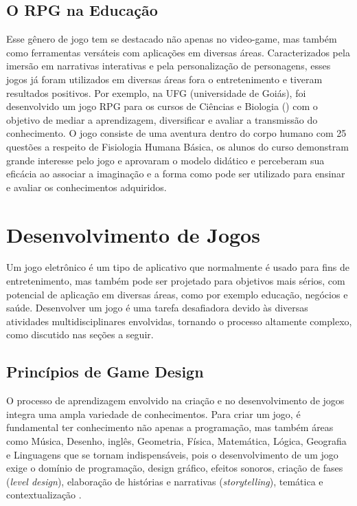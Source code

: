 \subsection{O RPG na Educação}
\label{sec:rpg-na-educacao}
Esse gênero de jogo tem se destacado não apenas no video-game, mas também como ferramentas versáteis com aplicações em diversas áreas. Caracterizados pela imersão em narrativas interativas e pela personalização de personagens, esses jogos já foram utilizados em diversas áreas fora o entretenimento e tiveram resultados positivos. Por exemplo, na UFG (universidade de Goiás), foi desenvolvido um jogo RPG para os cursos de Ciências e Biologia (\cite{soares2016role}) com o objetivo de mediar a aprendizagem, diversificar e avaliar a transmissão do conhecimento. O jogo consiste de uma aventura dentro do corpo humano com 25 questões a respeito de Fisiologia Humana Básica, os alunos do curso demonstram grande interesse pelo jogo e aprovaram o modelo didático e perceberam sua eficácia ao associar a imaginação e a forma como pode ser utilizado para ensinar e avaliar os conhecimentos adquiridos.


% 

\section{Desenvolvimento de Jogos}
\label{sec-desenvolvimento-de-jogos}
Um jogo eletrônico é um tipo de aplicativo que normalmente é usado para fins de entretenimento, mas também pode ser projetado para objetivos mais sérios, com potencial de aplicação em diversas áreas, como por exemplo educação, negócios e saúde. Desenvolver um jogo é uma tarefa desafiadora devido às diversas atividades multidisciplinares envolvidas, tornando o processo altamente complexo, como discutido nas seções a seguir. 

\subsection{Princípios de Game Design}
\label{sec:principios-de-game-design}
O processo de aprendizagem envolvido na criação e no desenvolvimento de jogos integra uma ampla variedade de conhecimentos. Para criar um jogo, é fundamental ter conhecimento não apenas a programação, mas também áreas como Música, Desenho, inglês, Geometria, Física, Matemática, Lógica, Geografia e Linguagens que se tornam indispensáveis, pois o desenvolvimento de um jogo exige o domínio de programação, design gráfico, efeitos sonoros, criação de fases (\textit{level design}), elaboração de histórias e narrativas (\textit{storytelling}), temática e contextualização \cite{cestari2022aprendizagem}.

